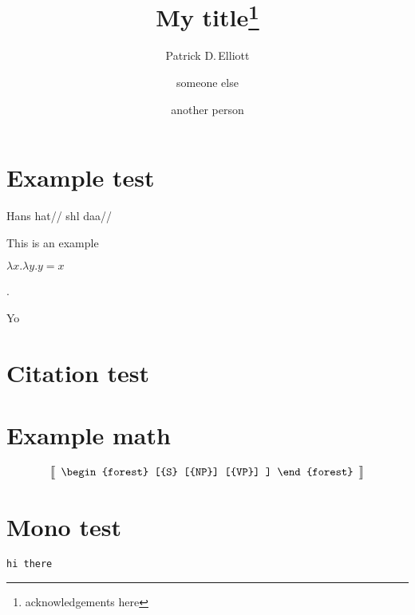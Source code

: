 \documentclass[12pt,a4paper]{ling-paper}
\title{My title\thanks{acknowledgements here}}
\author{Patrick D.\,Elliott
\and
someone else
\and
another person}
\begin{document}
\maketitle

\begin{abstract}
\kant[1]
\end{abstract}

\section{Example test}

\ex
\begingl
\gla Hans hat//
\glb shl daa//
\endgl
\xe

\ex
This is an example
\xe

\ex
\(λ x . λ y . y = x\)
\xe

\ex[lingstyle=exarrbelow]\tikzexsetup%
{} .
\xe

Yo

\section{Citation test}

\cite{heim_presupposition_1992}

\section{Example math}



\[
\left\llbracket
\begin{array}{c}
\begin{forest}
[{S}
  [{NP}]
  [{VP}]
]
\end{forest}
\end{array}
\right\rrbracket
\]

\section{Mono test}

\texttt{hi there}

\printbibliography
\end{document}
